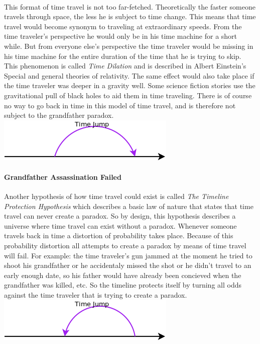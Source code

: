 \paragraph{}
This format of time travel is not too far-fetched. Theoretically the faster someone travels through space, the less he is subject to time change. This means that time travel would become synonym to traveling at extraordinary speeds. From the time traveler's perspective he would only be in his time machine for a short while. But from everyone else's perspective the time traveler would be missing in his time machine for the entire duration of the time that he is trying to skip. This phenomenon is called \emph{Time Dilation} and is described in Albert Einstein's Special and general theories of relativity. The same effect would also take place if the time traveler was deeper in a gravity well. Some science fiction stories use the gravitational pull of black holes to aid them in time traveling. There is of course no way to go back in time in this model of time travel, and is therefore not subject to the grandfather paradox.
\\
\includegraphics[scale=0.5]{./images/forward.png}

\paragraph{Grandfather Assassination Failed}
Another hypothesis of how time travel could exist is called \emph{The Timeline Protection Hypothesis} which describes a basic law of nature that states that time travel can never create a paradox. So by design, this hypothesis describes a universe where time travel can exist without a paradox. Whenever someone travels back in time a distortion of probability takes place. Because of this probability distortion all attempts to create a paradox by means of time travel will fail. For example: the time traveler's gun jammed at the moment he tried to shoot his grandfather or he accidentaly missed the shot or he didn't travel to an early enough date, so his father would have already been concieved when the grandfather was killed, etc. So the timeline protects itself by turning all odds against the time traveler that is trying to create a paradox.
\\
\includegraphics[scale=0.5]{./images/fail.png}


